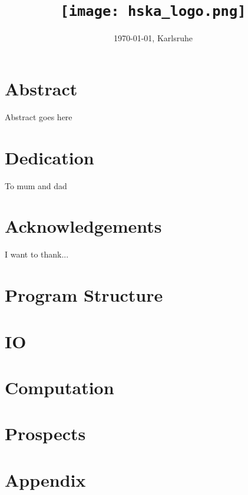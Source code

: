 \documentclass[12pt, oneside]{report}
\title{
	{\GetTitle{}}\\
	{\texttt{[image: hska\_logo.png]}}
}
\author{\GetAuthor{}}
\date{\today{}, Karlsruhe}
\begin{document}
\newpage
\listoftodos[Notes]
\newpage

\maketitle
\setcounter{page}{1}

\chapter*{Abstract}
Abstract goes here

\chapter*{Dedication}
To mum and dad

\chapter*{Acknowledgements}
I want to thank...


\tableofcontents


\chapter{Program Structure}


\chapter{IO}


\chapter{Computation}


\chapter{Prospects}




\appendix


\chapter{Appendix}

\cleardoublepage
{}
{}
\listoffigures

\printbibliography
\end{document}
